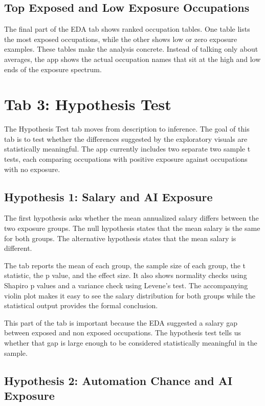 \documentclass[11pt]{article}
\begin{document}
\subsection*{Top Exposed and Low Exposure Occupations}

The final part of the EDA tab shows ranked occupation tables. One table lists the most exposed occupations, while the other shows low or zero exposure examples. These tables make the analysis concrete. Instead of talking only about averages, the app shows the actual occupation names that sit at the high and low ends of the exposure spectrum.

\section*{Tab 3: Hypothesis Test}

The Hypothesis Test tab moves from description to inference. The goal of this tab is to test whether the differences suggested by the exploratory visuals are statistically meaningful. The app currently includes two separate two sample t tests, each comparing occupations with positive exposure against occupations with no exposure.

\subsection*{Hypothesis 1: Salary and AI Exposure}

The first hypothesis asks whether the mean annualized salary differs between the two exposure groups. The null hypothesis states that the mean salary is the same for both groups. The alternative hypothesis states that the mean salary is different.

The tab reports the mean of each group, the sample size of each group, the t statistic, the p value, and the effect size. It also shows normality checks using Shapiro p values and a variance check using Levene's test. The accompanying violin plot makes it easy to see the salary distribution for both groups while the statistical output provides the formal conclusion.

This part of the tab is important because the EDA suggested a salary gap between exposed and non exposed occupations. The hypothesis test tells us whether that gap is large enough to be considered statistically meaningful in the sample.

\subsection*{Hypothesis 2: Automation Chance and AI Exposure}
\end{document}
